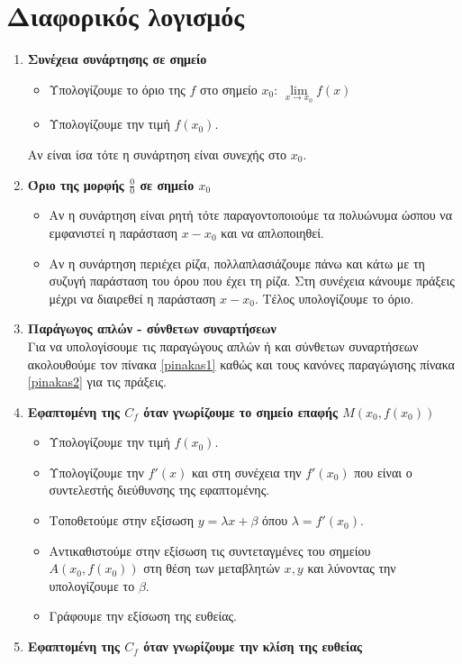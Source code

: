 \documentclass[a4paper,11pt]{article}
\begin{document}
\section{Διαφορικός λογισμός}
\begin{enumerate}[label=\bf\thesection.\arabic*.]
\item\textbf{Συνέχεια συνάρτησης σε σημείο}
\begin{itemize}
\item Υπολογίζουμε το όριο της $ f $ στο σημείο $ x_0 $: $\lim\limits_{x\to x_0}{f(x)}$
\item Υπολογίζουμε την τιμή $f(x_0)$.
\end{itemize}
Αν είναι ίσα τότε η συνάρτηση είναι συνεχής στο $x_0$.
\item\textbf{Όριο της μορφής $\frac{0}{0}$ σε σημείο $ x_0 $}
\begin{itemize}
\item Αν η συνάρτηση είναι ρητή τότε παραγοντοποιούμε τα πολυώνυμα ώσπου να εμφανιστεί η παράσταση $ x-x_0 $ και να απλοποιηθεί.
\item Αν η συνάρτηση περιέχει ρίζα, πολλαπλασιάζουμε πάνω και κάτω με τη συζυγή παράσταση του όρου που έχει τη ρίζα. Στη συνέχεια κάνουμε πράξεις μέχρι να διαιρεθεί η παράσταση $x-x_0$. Τέλος υπολογίζουμε το όριο.
\end{itemize}
\item\textbf{Παράγωγος απλών - σύνθετων συναρτήσεων}\\
Για να υπολογίσουμε τις παραγώγους απλών ή και σύνθετων συναρτήσεων ακολουθούμε τον πίνακα \ref{pinakas1} καθώς και τους κανόνες παραγώγισης πίνακα \ref{pinakas2} για τις πράξεις.
\item\textbf{Εφαπτομένη της $C_f$ όταν γνωρίζουμε το σημείο επαφής $ M(x_0,f(x_0))$}
\begin{itemize}
\item Υπολογίζουμε την τιμή $f(x_0)$.
\item Υπολογίζουμε την $f'(x)$ και στη συνέχεια την $f'(x_0)$ που είναι ο συντελεστής διεύθυνσης της εφαπτομένης.
\item Τοποθετούμε στην εξίσωση $y=\lambda x+\beta$ όπου $\lambda=f'(x_0)$.
\item Αντικαθιστούμε στην εξίσωση τις συντεταγμένες του σημείου $A(x_0,f(x_0))$ στη θέση των μεταβλητών $x,y$ και λύνοντας την υπολογίζουμε το $\beta$.
\item Γράφουμε την εξίσωση της ευθείας.
\end{itemize}
\item\textbf{Εφαπτομένη της $C_f$ όταν γνωρίζουμε την κλίση της ευθείας}

\end{enumerate}
\end{document}
